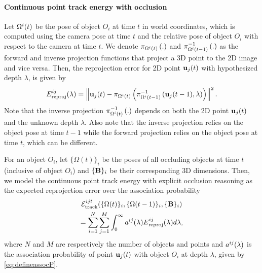 \vspace{-0.3cm}
\paragraph{Continuous point track energy with occlusion}
Let $\Omega^{i}(t)$ be the pose of object $O_i$ at time $t$ in world coordinates, which is computed using the camera pose at time $t$ and the relative pose of object $O_i$ with respect to the camera at time $t$. We denote $\pi_{\Omega^{i}(t)}\left(.\right)$ and $\pi^{-1}_{\Omega^{i}(t-1)}\left(.\right)$ as the forward and inverse projection functions that project a 3D point to the 2D image and vice versa. Then, the reprojection error for 2D point $\mathbf{u}_j(t)$ with hypothesized depth $\lambda$, is given by
\begin{equation}
E^{ij}_{\text{reproj}}(\lambda) = \left\|\mathbf{u}_j(t) - \pi_{\Omega^{i}(t)}\left(\pi^{-1}_{\Omega^{i}(t-1)}\left(\mathbf{u}_j(t-1), \lambda\right)\right)\right\|^2.
\label{eq:reprojerror}
\end{equation}
Note that the inverse projection $\pi^{-1}_{\Omega^{i}(t)}\left(.\right)$ depends on both the 2D point $\mathbf{u}_j(t)$ and the unknown depth $\lambda$. Also note that the inverse projection relies on the object pose at time $t-1$ while the forward projection relies on the object pose at time $t$, which can be different.

For an object $O_i$, let $\{ \Omega (t) \}_i$ be the poses of all occluding objects at time $t$ (inclusive of object $O_i$) and $ \{ \mathbf{B} \}_i$ be their corresponding 3D dimensions. Then, we model the continuous point track energy with explicit occlusion reasoning as the expected reprojection error over the association probability
\begin{multline}
  \mathcal{E}^{ijt}_{\text{track}}(\{ \Omega (t) \}_i, \{ \Omega (t-1) \}_i, \{ \mathbf{B} \}_i )
  \\
    = \sum_{i=1}^{N} 
    \sum_{j = 1}^{M}
    \int_0^\infty a^{ij}(\lambda)E^{ij}_{\text{reproj}}(\lambda) d\lambda,
\end{multline}
where $N$ and $M$ are respectively the number of objects and points and $a^{ij}(\lambda)$ is the association probability of point $\mathbf{u}_j(t)$ with object $O_i$ at depth $\lambda$, given by \eqref{eq:defineassocP}.


